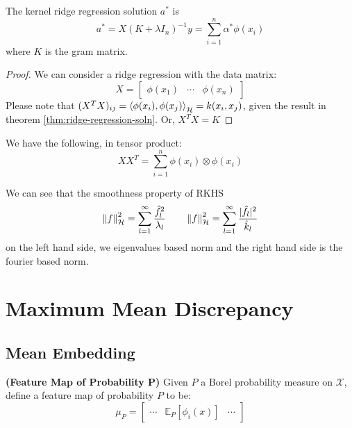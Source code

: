 \begin{corollary}
    The kernel ridge regression solution $a^*$ is 
    \begin{equation*}
        a^* = X(K+\lambda I_n)^{-1}y = \sum^n_{i=1}\alpha^*\phi(x_i)
    \end{equation*}
    where $K$ is the gram matrix.
\end{corollary}
\begin{proof}
    We can consider a ridge regression with the data matrix:
    \begin{equation*}
        X = \begin{bmatrix}
            \phi(x_1) & \cdots & \phi(x_n)
        \end{bmatrix}
    \end{equation*}
    Please note that $(X^TX)_{ij} = \left\langle \phi(x_i), \phi(x_j) \right\rangle_\mathcal{H} = k(x_i, x_j)$, given the result in theorem \ref{thm:ridge-regression-soln}. Or, $X^TX = K$
\end{proof}
\begin{remark}
    We have the following, in tensor product:
    \begin{equation*}
        XX^T = \sum^n_{i=1}\phi(x_i)\otimes\phi(x_i)
    \end{equation*}
\end{remark}

\begin{remark}
    We can see that the smoothness property of RKHS
    \begin{equation*}
        \left\lVert f\right\rVert^2_\mathcal{H} = \sum^\infty_{l=1}\frac{\hat{f}^2_l}{\lambda_l}\qquad \left\lVert f\right\rVert^2_\mathcal{H} = \sum^\infty_{l=1}\frac{|\hat{f}_l|^2}{\hat{k}_l}
    \end{equation*}
    on the left hand side, we eigenvalues based norm and the right hand side is the fourier based norm.
\end{remark}

\section{Maximum Mean Discrepancy}

\subsection{Mean Embedding}
\begin{definition}{\textbf{(Feature Map of Probability $\boldsymbol P$)}}
    Given $P$ a Borel probability measure on $\mathcal{X}$, define a feature map of probability $P$ to be:
    \begin{equation*}
        \mu_P = \begin{bmatrix}
            \cdots & \mathbb{E}_P[\phi_i(x)] & \cdots
        \end{bmatrix}
    \end{equation*}
\end{definition}

